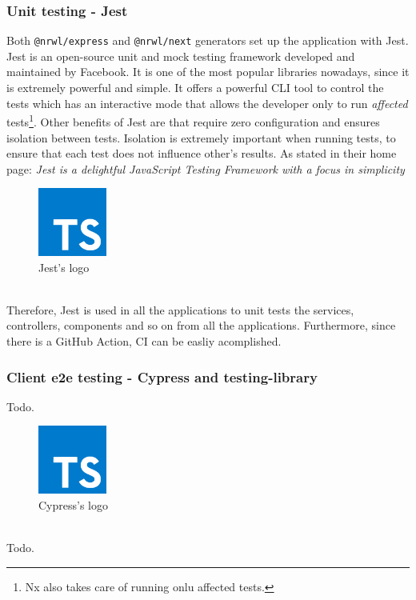 \documentclass[a4paper, 12pt, oneside]{book}
\begin{document}
\subsubsection{Unit testing - Jest}
Both \texttt{@nrwl/express} and \texttt{@nrwl/next} generators set up the application with Jest. Jest is an open-source unit and mock testing framework developed and maintained by Facebook. It is one of the most popular libraries nowadays, since it is extremely powerful and simple. It offers a powerful CLI tool to control the tests which has an interactive mode that allows the developer only to run \emph{affected} tests\footnote{Nx also takes care of running onlu affected tests.}. Other benefits of Jest are that require zero configuration and ensures isolation between tests. Isolation is extremely important when running tests, to ensure that each test does not influence other's results. As stated in their home page: \emph{Jest is a delightful JavaScript Testing Framework with a focus in simplicity}
\\
\begin{figure}[h!]
	\centering
	\includegraphics[width=0.2\textwidth]{assets/ts-logo.png}
	\caption{Jest's logo}
\end{figure}
\\
Therefore, Jest is used in all the applications to unit tests the services, controllers, components and so on from all the applications. Furthermore, since there is a GitHub Action, CI can be easliy acomplished.
\subsubsection{Client e2e testing - Cypress and testing-library}
Todo.
\\
\begin{figure}[h!]
	\centering
	\includegraphics[width=0.2\textwidth]{assets/ts-logo.png}
	\caption{Cypress's logo}
\end{figure}
\\
Todo.
\end{document}
